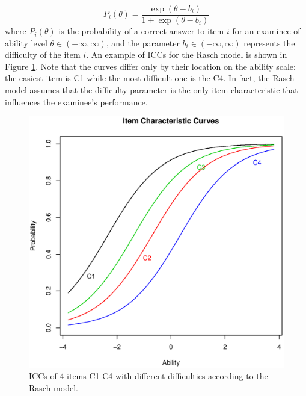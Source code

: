 {\begin{equation}
P_i(\theta)=\frac{\exp(\theta-b_i)}{1+ \exp(\theta-b_i)}
\end{equation}
where $P_i(\theta)$ is the probability of a correct answer to item $i$ for an examinee of ability level $\theta \in (-\infty,\infty)$, and the parameter $b_i \in (-\infty,\infty) $ represents the difficulty of the item $i$. An example of ICCs for the Rasch model is shown in Figure \ref{fig:icc}. Note that the curves differ only by their location on the ability scale: the easiest item is C1 while the most difficult one is the C4. In fact, the Rasch model assumes that the difficulty parameter is the only item characteristic that influences the examinee's performance.

\begin{figure}[h]
	\centering
	\includegraphics[scale=0.5]{Figures/icc.eps}
	\caption{ICCs of 4 items C1-C4 with different difficulties according to the Rasch model.}
	\label{fig:icc}
\end{figure}

}
